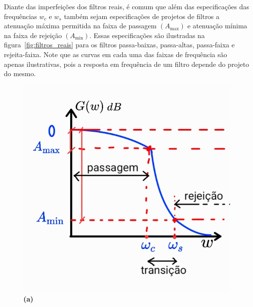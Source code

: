 Diante das imperfeições dos filtros reais, é comum que além das especificações das frequências $w_c$ e $w_s$ também sejam especificações de projetos de filtros a atenuação máxima permitida na faixa de passagem $(A_{\text{max}})$ e atenuação mínima na faixa de rejeição $(A_{\text{min}})$. Essas especificações são ilustradas na figura~\ref{fig:filtros_reais} para os filtros passa-baixas, passa-altas, passa-faixa e rejeita-faixa. Note que as curvas em cada uma das faixas de frequência são apenas ilustrativas, pois a resposta em frequência de um filtro depende do projeto do mesmo. 

\begin{figure}[h!]
    \centering
    \begin{minipage}[b]{0.32\linewidth}
        \includegraphics[width=\linewidth]{figuras/passa_baixas_real.png}
        \centering
        \\ \textbf{(a)}
    \end{minipage}
    \begin{minipage}[b]{0.32\linewidth}

\end{minipage}
\end{figure}
